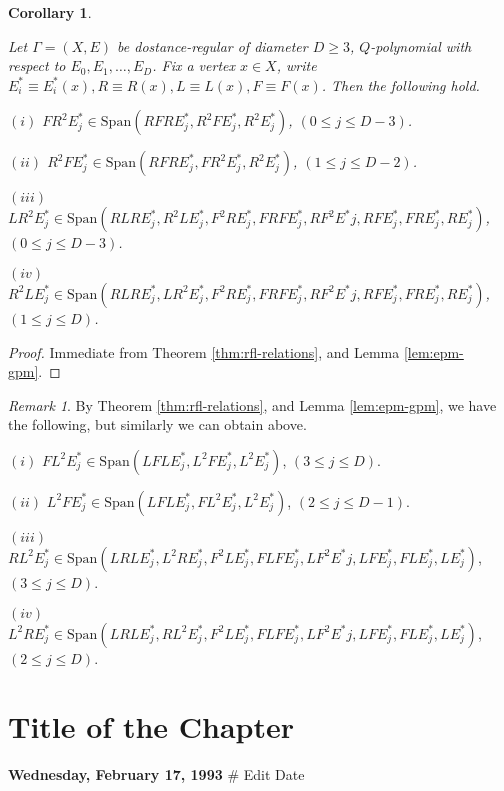 \documentclass[
]{book}
\newtheorem{corollary}{Corollary}[chapter]
\theoremstyle{definition}
\theoremstyle{definition}
\theoremstyle{definition}
\theoremstyle{definition}
\theoremstyle{remark}
\newtheorem*{remark}{Remark}
\begin{document}
\begin{corollary}
\protect\hypertarget{cor:fr2lr2r2l}{}\label{cor:fr2lr2r2l}

Let \(\Gamma = (X, E)\) be dostance-regular of diameter \(D\geq 3\), \(Q\)-polynomial with respect to \(E_0, E_1, \ldots, E_D\). Fix a vertex \(x\in X\), write \(E^*_i \equiv E^*_i(x), R\equiv R(x), L\equiv L(x), F\equiv F(x)\).
Then the following hold.

\((i)\) \(FR^2E^*_j \in \mathrm{Span}(RFRE^*_j, R^2FE^*_j, R^2E^*_j)\), \((0\leq j\leq D-3)\).

\((ii)\) \(R^2FE^*_j \in \mathrm{Span}(RFRE^*_j, FR^2E^*_j, R^2E^*_j)\), \((1\leq j\leq D-2)\).

\((iii)\) \(LR^2E^*_j \in \mathrm{Span}(RLRE^*_j, R^2LE^*_j, F^2RE^*_j, FRFE^*_j, RF^2E^*j, RFE^*_j, FRE^*_j, RE^*_j)\), \((0\leq j\leq D-3)\).

\((iv)\) \(R^2LE^*_j \in \mathrm{Span}(RLRE^*_j, LR^2E^*_j, F^2RE^*_j, FRFE^*_j, RF^2E^*j, RFE^*_j, FRE^*_j, RE^*_j)\), \((1\leq j\leq D)\).

\end{corollary}

\begin{proof}
Immediate from Theorem \ref{thm:rfl-relations}, and Lemma \ref{lem:epm-gpm}.
\end{proof}

\begin{remark}

By Theorem \ref{thm:rfl-relations}, and Lemma \ref{lem:epm-gpm}, we have the following, but similarly we can obtain above.

\((i)\) \(FL^2E^*_j \in \mathrm{Span}(LFLE^*_j, L^2FE^*_j, L^2E^*_j)\), \((3\leq j\leq D)\).

\((ii)\) \(L^2FE^*_j \in \mathrm{Span}(LFLE^*_j, FL^2E^*_j, L^2E^*_j)\), \((2\leq j\leq D-1)\).

\((iii)\) \(RL^2E^*_j \in \mathrm{Span}(LRLE^*_j, L^2RE^*_j, F^2LE^*_j, FLFE^*_j, LF^2E^*j, LFE^*_j, FLE^*_j, LE^*_j)\), \((3\leq j\leq D)\).

\((iv)\) \(L^2RE^*_j \in \mathrm{Span}(LRLE^*_j, RL^2E^*_j, F^2LE^*_j, FLFE^*_j, LF^2E^*j, LFE^*_j, FLE^*_j, LE^*_j)\), \((2\leq j\leq D)\).

\end{remark}

\hypertarget{lec55}{%
\chapter{Title of the Chapter}\label{lec55}}

\textbf{Wednesday, February 17, 1993} \# Edit Date

  

\printindex
\end{document}
